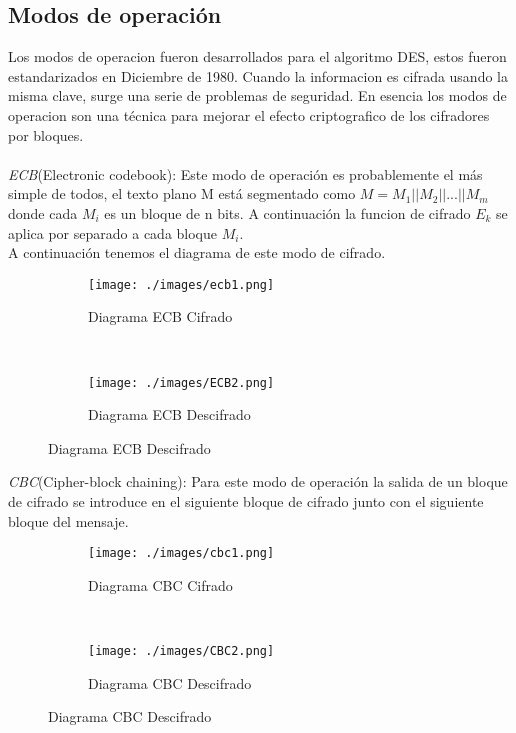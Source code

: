 \subsection{Modos de operación}
Los modos de operacion fueron desarrollados para el algoritmo DES, estos fueron estandarizados en Diciembre de 1980. 
Cuando la informacion es cifrada usando la misma clave, surge una serie de problemas de seguridad. En esencia los modos de operacion son una técnica para mejorar el efecto criptografico de los cifradores por bloques.\cite{modes}\\\\
\textit{ECB}(Electronic codebook): Este modo de operación es probablemente el más simple de todos, el texto plano M está segmentado como $ M=M_1||M_2||...||M_m$ donde cada $M_i$ es un bloque de n bits. A continuación la funcion de cifrado $E_k$ se aplica por separado a cada bloque $M_i$. \\
A continuación tenemos el diagrama de este modo de cifrado.\\
\begin{figure}[h]
    \centering
    \begin{subfigure}[t]{0.5\textwidth}
        \centering
        \texttt{[image: ./images/ecb1.png]}
        \caption{Diagrama ECB Cifrado}
        \label{fig:1-3-1}
    \end{subfigure}%
    ~ 
    \begin{subfigure}[t]{0.5\textwidth}
        \centering
        \texttt{[image: ./images/ECB2.png]}
        \caption{Diagrama ECB Descifrado}
        \label{fig:1-3-1}
    \end{subfigure}
    \label{fig:protocol}
\end{figure}


\textit{CBC}(Cipher-block chaining): Para este modo de operación la salida de un bloque de cifrado se introduce en el siguiente bloque de cifrado junto con el siguiente bloque del mensaje.\\

\begin{figure}[h]
    \centering
    \begin{subfigure}[t]{0.5\textwidth}
        \centering
        \texttt{[image: ./images/cbc1.png]}
        \caption{Diagrama CBC Cifrado}
        \label{fig:1-4-1}
    \end{subfigure}%
    ~ 
    \begin{subfigure}[t]{0.5\textwidth}
        \centering
        \texttt{[image: ./images/CBC2.png]}
        \caption{Diagrama CBC Descifrado}
        \label{fig:1-4-1}
    \end{subfigure}
    \label{fig:protocol}
\end{figure}

